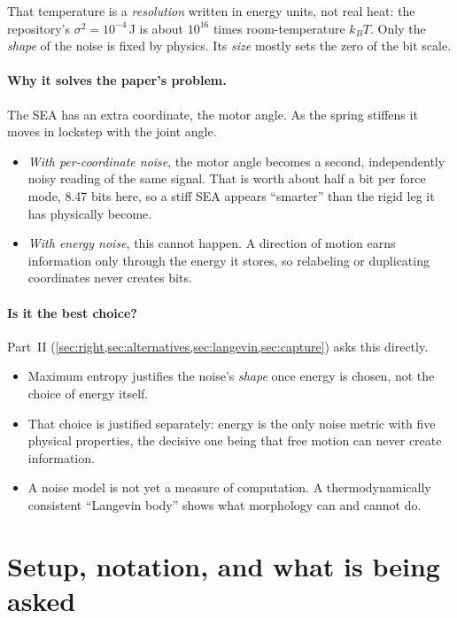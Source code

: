 \documentclass[11pt]{article}
\theoremstyle{definition}
\theoremstyle{remark}
\begin{document}
That temperature is a \emph{resolution} written in energy units, not real heat: the
repository's $\sigma^2=10^{-4}$\,J is about $10^{16}$ times room-temperature $k_BT$. Only
the \emph{shape} of the noise is fixed by physics. Its \emph{size} mostly sets the zero of
the bit scale.

\paragraph{Why it solves the paper's problem.} The SEA has an extra coordinate, the motor
angle. As the spring stiffens it moves in lockstep with the joint angle.
\begin{itemize}[nosep]
  \item \emph{With per-coordinate noise}, the motor angle becomes a second, independently
        noisy reading of the same signal. That is worth about half a bit per force mode,
        8.47 bits here, so a stiff SEA appears ``smarter'' than the rigid leg it has
        physically become.
  \item \emph{With energy noise}, this cannot happen. A direction of motion earns
        information only through the energy it stores, so relabeling or duplicating
        coordinates never creates bits.
\end{itemize}

\paragraph{Is it the best choice?} Part~II (\cref{sec:right,sec:alternatives,sec:langevin,sec:capture})
asks this directly.
\begin{itemize}[nosep]
  \item Maximum entropy justifies the noise's \emph{shape} once energy is chosen, not the
        choice of energy itself.
  \item That choice is justified separately: energy is the only noise metric with five
        physical properties, the decisive one being that free motion can never create
        information.
  \item A noise model is not yet a measure of computation. A thermodynamically consistent
        ``Langevin body'' shows what morphology can and cannot do.
\end{itemize}

\section{Setup, notation, and what is being asked}
\label{sec:setup}
\end{document}
